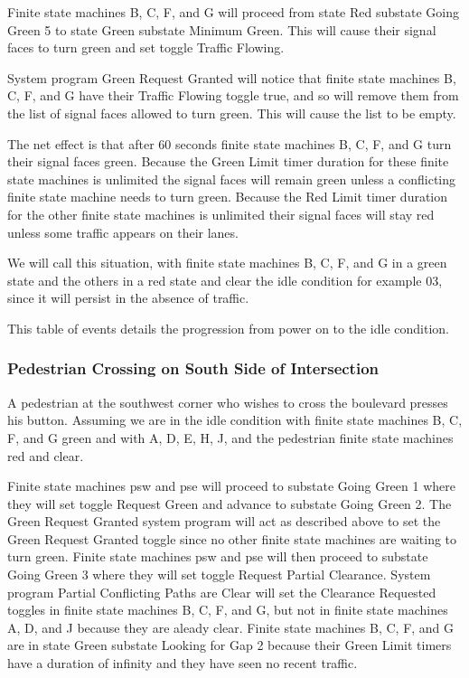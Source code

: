 \documentclass[letterpaper,twoside]{article}
\begin{document}
Finite state machines B, C, F, and G will proceed from state Red substate
Going Green 5 to state Green substate Minimum Green.
This will cause their signal faces to turn green and set toggle
Traffic Flowing.

System program Green Request Granted will notice that finite state machines
B, C, F, and G have their Traffic Flowing toggle true,
and so will remove them from the list of signal faces allowed to turn green.
This will cause the list to be empty.

The net effect is that after 60 seconds finite state machines
B, C, F, and G turn their signal faces green.
Because the Green Limit timer duration for these finite state machines
is unlimited the signal faces  will remain green unless
a conflicting finite state machine needs to turn green.  Because the Red Limit
timer duration for the other finite state machines is unlimited
their signal faces will stay red unless some traffic appears on their lanes.

We will call this situation, with finite state machines B, C, F, and G
in a green state and the others in a red state and clear the idle condition
for example 03, since it will persist in the absence of traffic.

This table of events details the progression from power on to the idle
condition.



\subsubsection{Pedestrian Crossing on South Side of Intersection}
A pedestrian at the southwest corner who wishes to cross the boulevard
presses his button.  Assuming we are in the idle condition
with finite state machines B, C, F, and G green and with A, D, E, H, J,
and the pedestrian finite state machines red and clear.

Finite state machines psw and pse will proceed to substate
Going Green 1 where they will set toggle Request Green and
advance to substate Going Green 2.
The Green Request Granted system program will act
as described above to set the Green Request Granted toggle since no other
finite state machines are waiting to turn green.
Finite state machines psw and pse will then
proceed to substate Going Green 3 where they will set toggle Request Partial
Clearance.  System program Partial Conflicting Paths are Clear will set
the Clearance Requested toggles in finite state machines B, C, F, and G,
but not in finite state machines A, D, and J because they are aleady clear.
Finite state machines B, C, F, and G are in state Green substate
Looking for Gap 2 because their Green Limit timers have a
duration of infinity and they have seen no recent traffic.
\end{document}
